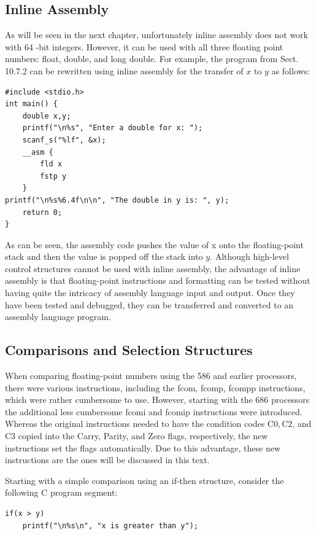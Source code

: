 \documentclass[10pt]{book}
\begin{document}
\subsection{Inline Assembly}
As will be seen in the next chapter, unfortunately inline assembly does not work with 64 -bit integers. However, it can be used with all three floating point numbers: float, double, and long double. For example, the program from Sect. 10.7.2 can be rewritten using inline assembly for the transfer of $x$ to $y$ as follows:

\begin{verbatim}
#include <stdio.h>
int main() {
    double x,y;
    printf("\n%s", "Enter a double for x: ");
    scanf_s("%lf", &x);
    __asm {
        fld x
        fstp y
    }
printf("\n%s%6.4f\n\n", "The double in y is: ", y);
    return 0;
}
\end{verbatim}

As can be seen, the assembly code pushes the value of x onto the floating-point stack and then the value is popped off the stack into $y$. Although high-level control structures cannot be used with inline assembly, the advantage of inline assembly is that floating-point instructions and formatting can be tested without having quite the intricacy of assembly language input and output. Once they have been tested and debugged, they can be transferred and converted to an assembly language program.


\subsection{Comparisons and Selection Structures}
When comparing floating-point numbers using the 586 and earlier processors, there were various instructions, including the fcom, fcomp, fcompp instructions, which were rather cumbersome to use. However, starting with the 686 processors the additional less cumbersome fcomi and fcomip instructions were introduced. Whereas the original instructions needed to have the condition codes $\mathrm{C} 0, \mathrm{C} 2$, and C3 copied into the Carry, Parity, and Zero flags, respectively, the new instructions set the flags automatically. Due to this advantage, these new instructions are the ones will be discussed in this text.

Starting with a simple comparison using an if-then structure, consider the following C program segment:

\begin{verbatim}
if(x > y)
    printf("\n%s\n", "x is greater than y");
\end{verbatim}
\end{document}
